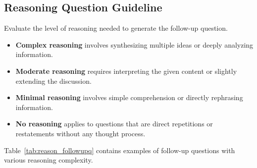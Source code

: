 \subsection{Reasoning Question Guideline}

Evaluate the level of reasoning needed to generate the follow-up question. 
\begin{itemize}
    \item \textbf{Complex reasoning} involves synthesizing multiple ideas or deeply analyzing information.
    \item \textbf{Moderate reasoning} requires interpreting the given content or slightly extending the discussion.
    \item \textbf{Minimal reasoning} involves simple comprehension or directly rephrasing information.
    \item \textbf{No reasoning} applies to questions that are direct repetitions or restatements without any thought process.
\end{itemize}

Table~\ref{tab:reason_followupq} contains examples of follow-up questions with various reasoning complexity.

